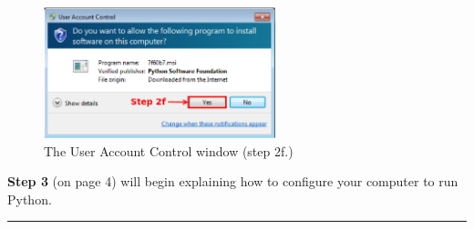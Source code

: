 \documentclass[11pt,english]{article}
\newcommand{\myhrule}{\vspace{0.3cm}\hrule\vspace{0.3cm}}
\begin{document}
\begin{figure}[h]
\begin{center}
\includegraphics[width=0.6\textwidth]{dia11}
\end{center}
\caption{The User Account Control window (step 2f.)}
\label{fig:dia11}
\end{figure}
\vfill
{\bf Step 3} (on page 4) will begin explaining how to configure your computer
to run Python.
\myhrule
\end{document}
